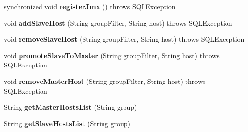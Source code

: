 \begin{DoxyCompactItemize}
\item 
\mbox{\label{classcom_1_1mysql_1_1cj_1_1jdbc_1_1jmx_1_1_replication_group_manager_ac82ea242ca350bee06e9ce072bff1f3a}} 
synchronized void {\bfseries register\+Jmx} ()  throws S\+Q\+L\+Exception 
\item 
\mbox{\label{classcom_1_1mysql_1_1cj_1_1jdbc_1_1jmx_1_1_replication_group_manager_a30c0567e7ae4bdca704ffe7a8f45f8ce}} 
void {\bfseries add\+Slave\+Host} (String group\+Filter, String host)  throws S\+Q\+L\+Exception 
\item 
\mbox{\label{classcom_1_1mysql_1_1cj_1_1jdbc_1_1jmx_1_1_replication_group_manager_a56956d19b252d2f12b5e345a8df2be4b}} 
void {\bfseries remove\+Slave\+Host} (String group\+Filter, String host)  throws S\+Q\+L\+Exception 
\item 
\mbox{\label{classcom_1_1mysql_1_1cj_1_1jdbc_1_1jmx_1_1_replication_group_manager_a97a4d471528e70781d141c633c3fa9d0}} 
void {\bfseries promote\+Slave\+To\+Master} (String group\+Filter, String host)  throws S\+Q\+L\+Exception 
\item 
\mbox{\label{classcom_1_1mysql_1_1cj_1_1jdbc_1_1jmx_1_1_replication_group_manager_a055b835430302ebd6361b7644082878e}} 
void {\bfseries remove\+Master\+Host} (String group\+Filter, String host)  throws S\+Q\+L\+Exception 
\item 
\mbox{\label{classcom_1_1mysql_1_1cj_1_1jdbc_1_1jmx_1_1_replication_group_manager_adaeaa362a31a245bf62d0a3d475e80d5}} 
String {\bfseries get\+Master\+Hosts\+List} (String group)
\item 
\mbox{\label{classcom_1_1mysql_1_1cj_1_1jdbc_1_1jmx_1_1_replication_group_manager_a0fb158d2a83806c0f3777283e54afb3c}} 
String {\bfseries get\+Slave\+Hosts\+List} (String group)

\end{DoxyCompactItemize}
